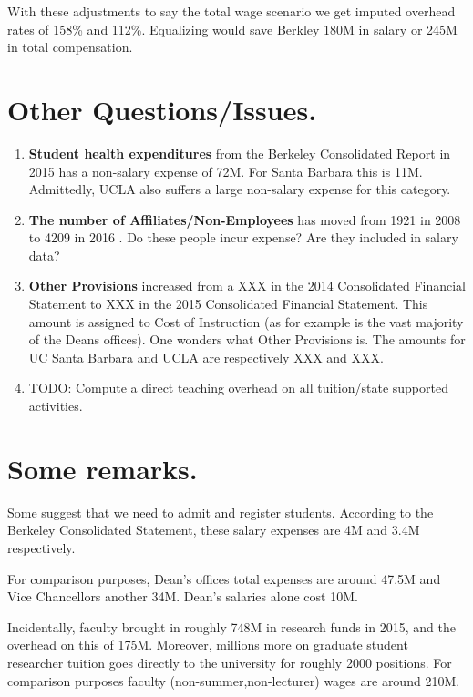 \documentclass{article}
\begin{document}
With these adjustments to say the total wage
scenario we get imputed overhead rates of
158\% and 112\%.  Equalizing would save
Berkley 180M in salary or 245M in total
compensation.

\section{Other Questions/Issues.}

\begin{enumerate}
\item
{\bf Student health expenditures} from the Berkeley Consolidated
Report \cite{UCB-consolidated} in 2015 has a non-salary expense of
72M.  For Santa Barbara \cite{UCSB-consolidated} this is
11M. Admittedly, UCLA \cite{UCLA-consolidated}
also suffers a large non-salary expense for this category.

\item
{\bf The number of Affiliates/Non-Employees} has moved from 1921
in 2008 to 4209 in 2016 \cite{cal-answer-census}.  Do these people incur expense? Are
they included in salary data?

\item
{\bf Other Provisions} increased from a XXX in the 2014 Consolidated Financial 
Statement to XXX in the 2015 Consolidated Financial Statement.  This amount
is assigned to Cost of Instruction (as for example is the vast majority
of the Deans offices).   One wonders what Other Provisions is.  The 
amounts for UC Santa Barbara and UCLA are respectively XXX and XXX. 

\item
TODO: Compute a direct teaching overhead on all tuition/state supported
activities. 

\end{enumerate}

\section{Some remarks.}

Some suggest that we need to admit and register students. According
to the Berkeley Consolidated Statement, these salary expenses
are 4M and 3.4M respectively.

For comparison purposes, Dean's offices total expenses are around
47.5M and Vice Chancellors another 34M.  Dean's salaries alone
cost 10M. 

Incidentally, faculty brought in roughly 748M in research funds in
2015, and the overhead on this of 175M.  Moreover, millions more on
graduate student researcher tuition goes directly to the university
for roughly 2000 positions.  For comparison purposes faculty
(non-summer,non-lecturer) wages are around 210M.





\end{document}
